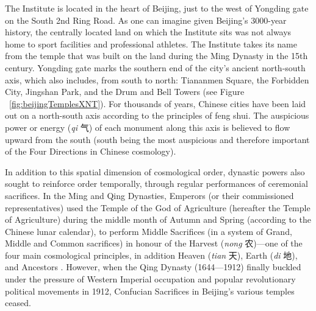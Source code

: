 \begin{CJK}{UTF8}{gbsn}
The Institute is located in the heart of Beijing, just to the west of Yongding gate on the South 2nd Ring Road. As one can imagine given Beijing's 3000-year history, the centrally located land on which the Institute sits was not always home to sport facilities and professional athletes.  The Institute takes its name from the temple that was built on the land during the Ming Dynasty in the 15th century.  Yongding gate marks the southern end of the city's ancient north-south axis, which also includes, from south to north: Tiananmen Square, the Forbidden City, Jingshan Park, and the Drum and Bell Towers (see Figure ~\ref{fig:beijingTemplesXNT}).  For thousands of years, Chinese cities have been laid out on a north-south axis according to the principles of feng shui. The auspicious power or energy (\textit{qi} 气) of each monument along this axis is believed to flow upward from the south (south being the most auspicious and therefore important of the Four Directions in Chinese cosmology).

In addition to this spatial dimension of cosmological order, dynastic powers also sought to reinforce order temporally, through regular performances of ceremonial sacrifices.  In the Ming and Qing Dynasties, Emperors (or their commissioned representatives) used the Temple of the God of Agriculture (hereafter the Temple of Agriculture) during the middle month of Autumn and Spring (according to the Chinese lunar calendar), to perform Middle Sacrifices (in a system of Grand, Middle and Common sacrifices) in honour of the Harvest (\textit{nong} 农)---one of the four main cosmological principles, in addition Heaven (\textit{tian} 天), Earth (\textit{di} 地), and Ancestors \citep[\textit{zu} 祖; see][98]{Brownell2008}.  However, when the Qing Dynasty (1644---1912) finally buckled under the pressure of Western Imperial occupation and popular revolutionary political movements in 1912, Confucian Sacrifices in Beijing's various temples ceased.


\end{CJK}
